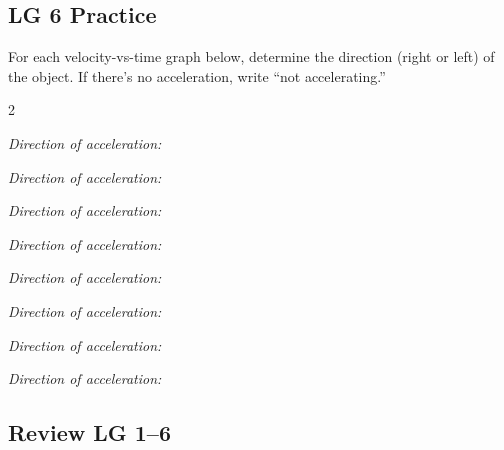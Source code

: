 \documentclass[answers]{exam}
\begin{document}
\clearpage

\subsection*{LG 6 Practice}

For each velocity-vs-time graph below, determine the direction (right or left) of the object. If there's no acceleration, write ``not accelerating.''


\begin{questions}
\begin{multicols}{2}

\question
\textit{Direction of acceleration:} \fillin[][3cm]


    

\question
\textit{Direction of acceleration:} \fillin[][3cm]



\question
\textit{Direction of acceleration:} \fillin[][3cm]


\question
\textit{Direction of acceleration:} \fillin[][3cm]


\vspace*{\fill}
\columnbreak



\question \textit{Direction of acceleration:} \fillin[leftward][3cm]

\question
\textit{Direction of acceleration:} \fillin[][3cm]


\question
\textit{Direction of acceleration:} \fillin[][3cm]


\question
\textit{Direction of acceleration:} \fillin[][3cm]






\end{multicols}
\end{questions}



\clearpage

\subsection*{Review LG 1--6}
\end{document}
